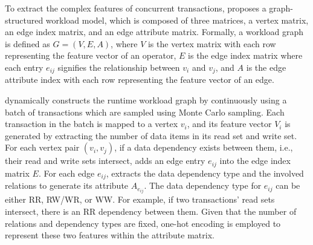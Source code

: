 {
\color{blue}
To extract the complex features of concurrent transactions, \sysname proposes a graph-structured workload model, which is composed of three matrices, a vertex matrix, an edge index matrix, and an edge attribute matrix. Formally, a workload graph is defined as $G=(V, E, A)$, where $V$ is the vertex matrix with each row representing the feature vector of an operator, $E$ is the edge index matrix where each entry $e_{ij}$ signifies the relationship between $v_i$ and $v_j$, and $A$ is the edge attribute index with each row representing the feature vector of an edge. 

\sysname dynamically constructs the runtime workload graph by continuously using a batch of transactions which are sampled using Monte Carlo sampling. Each transaction in the batch is mapped to a vertex $v_i$, and its feature vector $V_i$ is generated by extracting the number of data items in its read set and write set.
For each vertex pair $(v_i, v_j)$, if a data dependency exists between them, i.e., their read and write sets intersect, \sysname adds an edge entry $e_{ij}$ into the edge index matrix $E$. For each edge $e_{ij}$, \sysname extracts the data dependency type and the involved relations to generate its attribute $A_{e_{ij}}$. The data dependency type for $e_{ij}$ can be either RR, RW/WR, or WW. For example, if two transactions' read sets intersect, there is an RR dependency between them. Given that the number of relations and dependency types are fixed, one-hot encoding is employed to represent these two features within the attribute matrix.
}





